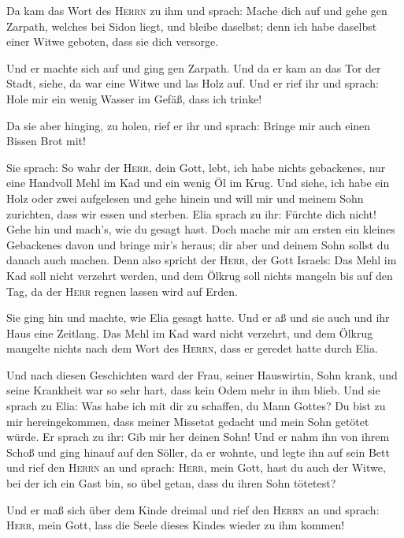  Da kam das Wort des \textsc{Herrn} zu ihm und sprach:
 Mache dich auf und gehe gen Zarpath, welches bei Sidon
liegt, und bleibe daselbst; denn ich habe daselbst einer Witwe geboten,
dass sie dich versorge.

 Und er machte sich auf und ging gen Zarpath. Und da er
kam an das Tor der Stadt, siehe, da war eine Witwe und las Holz auf. Und
er rief ihr und sprach: Hole mir ein wenig Wasser im Gefäß, dass ich
trinke!

 Da sie aber hinging, zu holen, rief er ihr und sprach:
Bringe mir auch einen Bissen Brot mit!

 Sie sprach: So wahr der \textsc{Herr}, dein Gott, lebt,
ich habe nichts gebackenes, nur eine Handvoll Mehl im Kad und ein wenig
Öl im Krug. Und siehe, ich habe ein Holz oder zwei aufgelesen und gehe
hinein und will mir und meinem Sohn zurichten, dass wir essen und
sterben.  Elia sprach zu ihr: Fürchte dich nicht! Gehe
hin und mach's, wie du gesagt hast. Doch mache mir am ersten ein kleines
Gebackenes davon und bringe mir's heraus; dir aber und deinem Sohn
sollst du danach auch machen.  Denn also spricht der
\textsc{Herr}, der Gott Israels: Das Mehl im Kad soll nicht verzehrt
werden, und dem Ölkrug soll nichts mangeln bis auf den Tag, da der
\textsc{Herr} regnen lassen wird auf Erden.

 Sie ging hin und machte, wie Elia gesagt hatte. Und er
aß und sie auch und ihr Haus eine Zeitlang.  Das Mehl im
Kad ward nicht verzehrt, und dem Ölkrug mangelte nichts nach dem Wort
des \textsc{Herrn}, dass er geredet hatte durch Elia.

 Und nach diesen Geschichten ward der Frau, seiner
Hauswirtin, Sohn krank, und seine Krankheit war so sehr hart, dass kein
Odem mehr in ihm blieb.  Und sie sprach zu Elia: Was habe
ich mit dir zu schaffen, du Mann Gottes? Du bist zu mir hereingekommen,
dass meiner Missetat gedacht und mein Sohn getötet würde.
 Er sprach zu ihr: Gib mir her deinen Sohn! Und er nahm
ihn von ihrem Schoß und ging hinauf auf den Söller, da er wohnte, und
legte ihn auf sein Bett  und rief den \textsc{Herrn} an
und sprach: \textsc{Herr}, mein Gott, hast du auch der Witwe, bei der
ich ein Gast bin, so übel getan, dass du ihren Sohn tötetest?

 Und er maß sich über dem Kinde dreimal und rief den
\textsc{Herrn} an und sprach: \textsc{Herr}, mein Gott, lass die Seele
dieses Kindes wieder zu ihm kommen!

